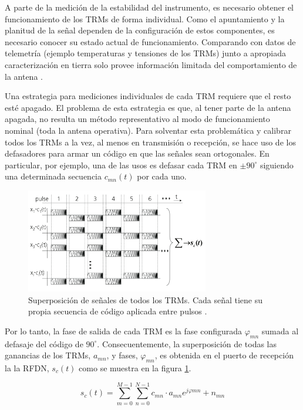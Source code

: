 A parte de la medición de la estabilidad del instrumento, es necesario obtener el funcionamiento de los TRMs de forma
individual. Como el apuntamiento y la planitud de la señal dependen de la configuración de estos componentes, es necesario
conocer su estado actual de funcionamiento. Comparando con datos de telemetría (ejemplo temperaturas y tensiones de los
TRMs) junto a apropiada caracterización en tierra solo provee información limitada del comportamiento de la antena \cite{Br2007}.

Una estrategia para mediciones individuales de cada TRM requiere que el resto esté apagado. El problema de esta estrategia
es que, al tener parte de la antena apagada, no resulta un método representativo al modo de funcionamiento nominal (toda la
antena operativa). Para solventar esta problemática y calibrar todos los TRMs a la vez, al menos en transmisión o recepción,
se hace uso de los defasadores para armar un código en que las señales sean ortogonales. En particular, por ejemplo, una de
las usos es defasar cada TRM en $\pm90^{\circ}$ siguiendo una determinada secuencia $c_{mn}(t)$ por cada uno.

\begin{figure}
 \centering
 \includegraphics[width=8cm]{gfx/superposition_signals_classic.png}
 \caption{Superposición de señales de todos los TRMs. Cada señal tiene su propia secuencia de código aplicada entre pulsos \cite{Br2007}.}
 \label{fig:sup_sign_classic}
\end{figure}

Por lo tanto, la fase de salida de cada TRM es la fase configurada $\varphi_{mn}$ sumada al defasaje del código de
$90^{\circ}$. Consecuentemente, la superposición de todas las ganancias de los TRMs, $a_{mn}$, y fases, $\varphi_{mn}$,
es obtenida en el puerto de recepción la la RFDN, $s_c(t)$ como se muestra en la figura \ref{fig:sup_sign_classic}.

\begin{equation}
	s_c(t) = \sum_{m=0}^{M-1}\sum_{n=0}^{N-1}c_{mn}\cdot a_{mn}e^{j\varphi{mn}} + n_{mn}
\end{equation}

